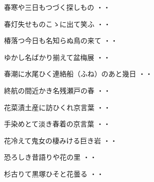 \vspace{0.6cm}
\begin{shiika}春寒や三日もつづく探しもの
\hfill{・・}\end{shiika}
\vspace{0.6cm}
\begin{shiika}春灯失せものこゝに出て笑ふ
\hfill{・・}\end{shiika}
\vspace{0.6cm}
\begin{shiika}椿落つ今日も名知らぬ鳥の来て
\hfill{・・}\end{shiika}
\vspace{0.6cm}
\begin{shiika}ゆかし名ばかり揃えて盆梅展
\hfill{・・}\end{shiika}
\vspace{0.6cm}
\begin{shiika}春潮に水尾ひく連絡船（ふね）のあと幾日
\hfill{・・}\end{shiika}
\vspace{0.6cm}
\begin{shiika}終航の間近かき名残瀬戸の春
\hfill{・・}\end{shiika}
\vspace{0.6cm}
\begin{shiika}花菜漬土産に訪ひくれ京言葉
\hfill{・・}\end{shiika}
\vspace{0.6cm}
\begin{shiika}手染めとて淡き春着の京言葉
\hfill{・・}\end{shiika}
\vspace{0.6cm}
\begin{shiika}花冷えて鬼女の棲みける巨き岩
\hfill{・・}\end{shiika}
\vspace{0.6cm}
\begin{shiika}恐ろしき昔語りや花の里
\hfill{・・}\end{shiika}
\vspace{0.6cm}
\begin{shiika}杉古りて黒塚ひそと花曇る
\hfill{・・}\end{shiika}

